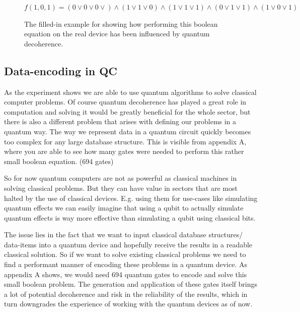 \begin{figure}
	\centering
	$f(1,0,1) = (0 \vee 0 \vee 0 \vee) \wedge (1 \vee 1 \vee 0)  \wedge ( 1 \vee 1 \vee  1) \wedge ( 0 \vee 1 \vee 1) \wedge  ( 1 \vee 0 \vee  1)$
	\caption{The filled-in example for showing how performing this boolean equation on the real device has been influenced by quantum decoherence.}
\end{figure}



\subsection{Data-encoding in QC}

As the experiment shows we are able to use quantum algorithms to solve classical computer problems. Of course quantum decoherence has played a great role in computation and solving it would be greatly beneficial for the whole sector, but there is also a different problem that arises with defining our problems in a quantum way. The way we represent data in a quantum circuit quickly becomes too complex for any large database structure. This is visible from appendix A, where you are able to see how many gates were needed to perform this rather small boolean equation. (694 gates)

So for now quantum computers are not as powerful as classical machines in solving classical problems. But they can have value in sectors that are most halted by the use of classical devices. E.g. using them for use-cases like simulating quantum effects we can easily imagine that using a qubit to actually simulate quantum effects is way more effective than simulating a qubit using classical bits.

The issue lies in the fact that we want to input classical database structures/ data-items into a quantum device and hopefully receive the results in a readable classical solution. So if we want to solve existing classical problems we need to find a performant manner of encoding these problems in a quantum device. As appendix A shows, we would need 694 quantum gates to encode and solve this small boolean problem. The generation and application of these gates itself brings a lot of potential decoherence and risk in the reliability of the results, which in turn downgrades the experience of working with the quantum devices as of now.

